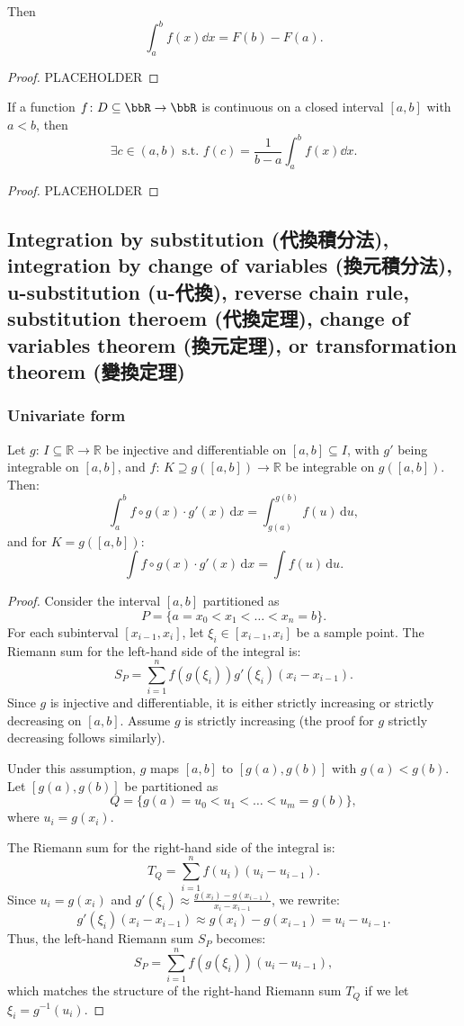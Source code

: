 \documentclass[a4paper,12pt]{report}
\begin{document}
\begin{itemize}
\begin{itemize}
Then
\[\int_a^bf(x)\dd{x}=F(b)-F(a).\]
\begin{proof}
PLACEHOLDER
\end{proof}
If a function $f\colon D\subseteq\bbR\to\bbR$ is continuous on a closed interval $[a,b]$ with $a<b$, then
\[\exists c\in (a, b)\text{\ s.t.\ }f(c)=\frac{1}{b-a}\int_a^bf(x)\dd{x}.\]
\begin{proof}
PLACEHOLDER
\end{proof}
\subsection{Integration by substitution (代換積分法), integration by change of variables (換元積分法), u-substitution (u-代換), reverse chain rule, substitution theroem (代換定理), change of variables theorem (換元定理), or transformation theorem (變換定理)}
\subsubsection{Univariate form}
Let $g:\,I\subseteq\mathbb{R}\to\mathbb{R}$ be injective and differentiable on $[a,b]\subseteq I$, with $g'$ being integrable on $[a,b]$, and $f:\,K\supseteq g([a,b])\to\mathbb{R}$ be integrable on $g([a,b])$. Then:
\[\int_a^bf\circ g(x)\cdot g'(x)\,\mathrm{d}x=\int_{g(a)}^{g(b)}f(u)\,\mathrm{d}u,\]
and for $K=g([a,b])$:
\[\int f\circ g(x)\cdot g'(x)\,\mathrm{d}x=\int f(u)\,\mathrm{d}u.\]
\begin{proof}
Consider the interval \([a, b]\) partitioned as
\[P = \{a = x_0 < x_1 < \dots  < x_n = b\}.\]
For each subinterval \([x_{i-1}, x_i]\), let \(\xi_i \in [x_{i-1}, x_i]\) be a sample point. The Riemann sum for the left-hand side of the integral is:
\[S_P = \sum_{i=1}^n f(g(\xi_i)) g'(\xi_i) (x_i - x_{i-1}).\]
Since \(g\) is injective and differentiable, it is either strictly increasing or strictly decreasing on \([a, b]\). Assume \(g\) is strictly increasing (the proof for \(g\) strictly decreasing follows similarly).

Under this assumption, \(g\) maps \([a, b]\) to \([g(a), g(b)]\) with \(g(a) < g(b)\). Let \([g(a), g(b)]\) be partitioned as
\[Q = \{g(a) = u_0 < u_1 < \dots  < u_m = g(b)\},\]
where \(u_i = g(x_i)\).

The Riemann sum for the right-hand side of the integral is:
\[T_Q = \sum_{i=1}^n f(u_i) (u_i - u_{i-1}).\]
Since \(u_i = g(x_i)\) and \(g'(\xi_i) \approx \frac{g(x_i) - g(x_{i-1})}{x_i - x_{i-1}}\), we rewrite:
\[ g'(\xi_i) (x_i - x_{i-1}) \approx g(x_i) - g(x_{i-1}) = u_i - u_{i-1}. \]
Thus, the left-hand Riemann sum \(S_P\) becomes:
\[ S_P = \sum_{i=1}^n f(g(\xi_i)) (u_i - u_{i-1}),\]
which matches the structure of the right-hand Riemann sum \(T_Q\) if we let \(\xi_i = g^{-1}(u_i)\).


\end{proof}
\end{itemize}
\end{itemize}
\end{document}
